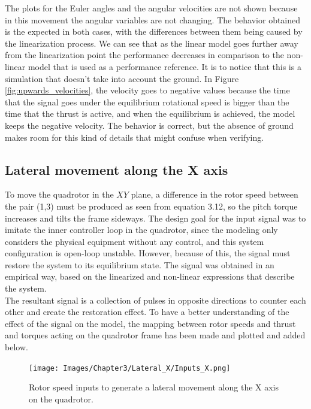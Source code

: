 The plots for the Euler angles and the angular velocities are not shown because in this movement the angular variables are not changing. The behavior obtained is the expected in both cases, with the differences between them being caused by the linearization process. We can see that as the linear model goes further away from the linearization point the performance decreases in comparison to the non-linear model that is used as a performance reference. It is to notice that this is a simulation that doesn't take into account the ground. In Figure \ref{fig:upwards_velocities}, the velocity goes to negative values because the time that the signal goes under the equilibrium rotational speed is bigger than the time that the thrust is active, and when the equilibrium is achieved, the model keeps the negative velocity. The behavior is correct, but the absence of ground makes room for this kind of details that might confuse when verifying. \newpage

\subsection{Lateral movement along the X axis}
To move the quadrotor in the $XY$ plane, a difference in the rotor speed between the pair (1,3) must be produced as seen from equation 3.12, so the pitch torque increases and tilts the frame sideways. The design goal for the input signal was to imitate the inner controller loop in the quadrotor, since the modeling only considers the physical equipment without any control, and this system configuration is open-loop unstable. However, because of this, the signal must restore the system to its equilibrium state. The signal was obtained in an empirical way, based on the linearized and non-linear expressions that describe the system. \\

The resultant signal is a collection of pulses in opposite directions to counter each other and create the restoration effect. To have a better understanding of the effect of the signal on the model, the mapping between rotor speeds and thrust and torques acting on the quadrotor frame has been made and plotted and added below.

\begin{figure}[h!]
\centering
\texttt{[image: Images/Chapter3/Lateral\_X/Inputs\_X.png]}
\caption{Rotor speed inputs to generate a lateral movement along the X axis on the quadrotor.}
\label{fig:lateralX_inputs}
\end{figure}

